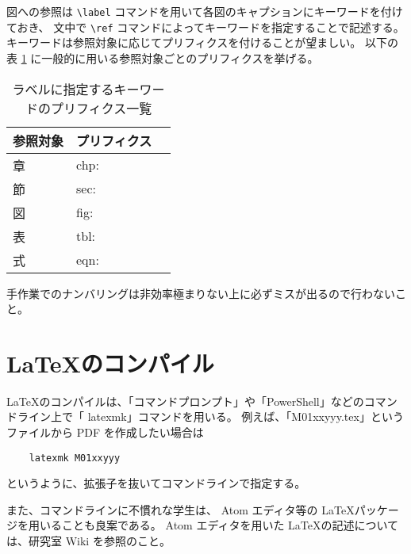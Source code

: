 図への参照は \verb+\label+ コマンドを用いて各図のキャプションにキーワードを付けておき、
文中で \verb+\ref+ コマンドによってキーワードを指定することで記述する。
キーワードは参照対象に応じてプリフィクスを付けることが望ましい。
以下の表 \ref{tbl:pre_list} に一般的に用いる参照対象ごとのプリフィクスを挙げる。

\begin{table}[H]
  \caption{ラベルに指定するキーワードのプリフィクス一覧}
  \label{tbl:pre_list}
  \centering
  \begin{tabular}{|l|l|r|} \hline
   参照対象	& プリフィクス \\ \hline
   章		& chp: \\ \hline
   節		& sec: \\ \hline
   図		& fig: \\ \hline
   表 		& tbl: \\ \hline
   式   	& eqn: \\ \hline
  \end{tabular}
\end{table}
手作業でのナンバリングは非効率極まりない上に必ずミスが出るので行わないこと。

\section{\LaTeX のコンパイル}
\LaTeX のコンパイルは、「コマンドプロンプト」や「PowerShell」などのコマンドライン上で「
latexmk」コマンドを用いる。
例えば、「M01xxyyy.tex」というファイルから PDF を作成したい場合は
\begin{verbatim}
    latexmk M01xxyyy
\end{verbatim}
というように、拡張子を抜いてコマンドラインで指定する。

また、コマンドラインに不慣れな学生は、
Atom エディタ等の \LaTeX パッケージを用いることも良案である。
Atom エディタを用いた \LaTeX の記述については、研究室 Wiki を参照のこと。
